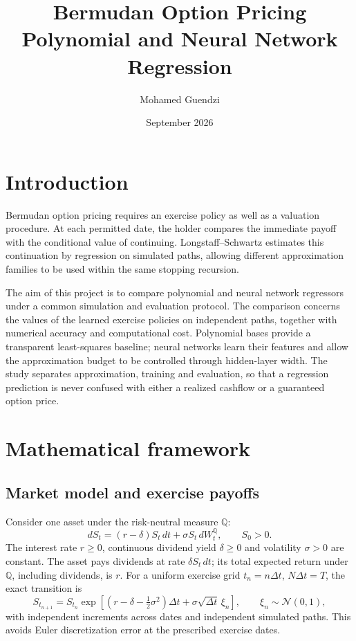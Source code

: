\documentclass[11pt,a4paper]{article}
\title{Bermudan Option Pricing\\[6pt]\large Polynomial and Neural Network Regression}
\author{Mohamed Guendzi}
\date{September 2026}
\begin{document}
\maketitle
{\setlength{\parskip}{0pt}
\renewcommand{\baselinestretch}{1}\small
\tableofcontents}
\clearpage
\section{Introduction}
Bermudan option pricing requires an exercise policy as well as a valuation
procedure. At each permitted date, the holder compares the immediate payoff
with the conditional value of continuing. Longstaff--Schwartz estimates this
continuation by regression on simulated paths, allowing different approximation
families to be used within the same stopping recursion.

The aim of this project is to compare polynomial and neural network regressors
under a common simulation and evaluation protocol. The comparison concerns the
values of the learned exercise policies on independent paths, together with
numerical accuracy and computational cost. Polynomial bases provide a transparent
least-squares baseline; neural networks learn their features and allow the
approximation budget to be controlled through hidden-layer width. The study
separates approximation, training and evaluation, so that a regression prediction
is never confused with either a realized cashflow or a guaranteed option price.

\section{Mathematical framework}
\subsection{Market model and exercise payoffs}
Consider one asset under the risk-neutral measure $\mathbb Q$:
\begin{equation}
 dS_t=(r-\delta)S_t\,dt+\sigma S_t\,dW_t^{\mathbb Q},\qquad S_0>0.
\end{equation}
The interest rate $r\geq0$, continuous dividend yield $\delta\geq0$ and volatility
$\sigma>0$ are constant. The asset pays dividends at rate $\delta S_t\,dt$;
its total expected return under $\mathbb Q$, including dividends, is $r$.
For a uniform exercise grid $t_n=n\Delta t$, $N\Delta t=T$, the exact transition is
\begin{equation}
 S_{t_{n+1}}=S_{t_n}\exp\!\left[
 (r-\delta-\tfrac12\sigma^2)\Delta t+
 \sigma\sqrt{\Delta t}\,\xi_n\right],\qquad \xi_n\sim\mathcal N(0,1),
\end{equation}
with independent increments across dates and independent simulated paths.
This avoids Euler discretization error at the prescribed exercise dates.
\end{document}
